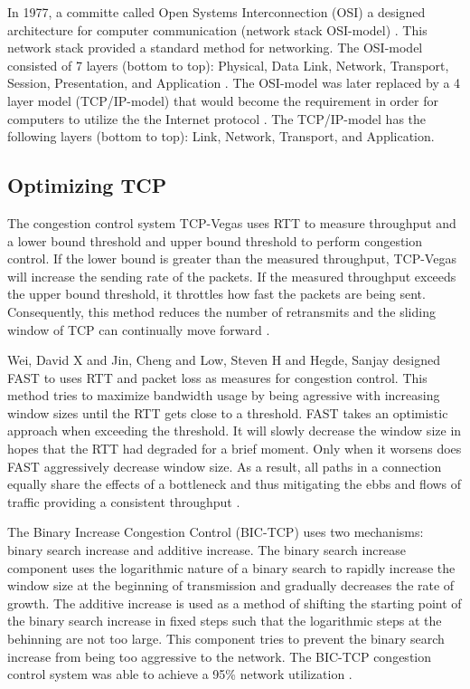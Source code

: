 In 1977, a committe called Open Systems Interconnection (OSI) a designed architecture for computer communication (network stack OSI-model) \cite{zimmermann1980osi}. This network stack provided a standard method for networking. The OSI-model consisted of 7 layers (bottom to top): Physical, Data Link, Network, Transport, Session, Presentation, and Application \cite{zimmermann1980osi}. The OSI-model was later replaced by a 4 layer model (TCP/IP-model) that would become the requirement in order for computers to utilize the the Internet protocol \cite{braden1989requirements}. The TCP/IP-model has the following layers (bottom to top): Link, Network, Transport, and Application.

\subsection{Optimizing TCP}

The congestion control system TCP-Vegas \cite{brakmo1995tcp} uses RTT to measure throughput and a lower bound threshold and upper bound threshold to perform congestion control. If the lower bound is greater than the measured throughput, TCP-Vegas will increase the sending rate of the packets. If the measured throughput exceeds the upper bound threshold, it throttles how fast the packets are being sent. Consequently, this method reduces the number of retransmits and the sliding window of TCP can continually move forward \cite{brakmo1995tcp}.

Wei, David X and Jin, Cheng and Low, Steven H and Hegde, Sanjay designed FAST to uses RTT and packet loss as measures for congestion control. This method tries to maximize bandwidth usage by being agressive with increasing window sizes until the RTT gets close to a threshold. FAST takes an optimistic approach when exceeding the threshold. It will slowly decrease the window size in hopes that the RTT had degraded for a brief moment. Only when it worsens does FAST aggressively decrease window size. As a result, all paths in a connection equally share the effects of a bottleneck and thus mitigating the ebbs and flows of traffic providing a consistent throughput \cite{wei2006fast}.

The Binary Increase Congestion Control (BIC-TCP) \cite{xu2004binary} uses two mechanisms: binary search increase and additive increase. The binary search increase component uses the logarithmic nature of a binary search to rapidly increase the window size at the beginning of transmission and gradually decreases the rate of growth. The additive increase is used as a method of shifting the starting point of the binary search increase in fixed steps such that the logarithmic steps at the behinning are not too large. This component tries to prevent the binary search increase from being too aggressive to the network. The BIC-TCP congestion control system was able to achieve a 95\% network utilization \cite{xu2004binary}.

